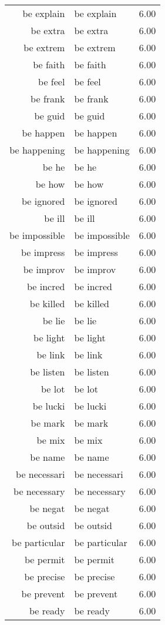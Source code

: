 \begin{table}[ht]
\begin{tabular}{rlr}
  be explain & be explain & 6.00 \\ 
  be extra & be extra & 6.00 \\ 
  be extrem & be extrem & 6.00 \\ 
  be faith & be faith & 6.00 \\ 
  be feel & be feel & 6.00 \\ 
  be frank & be frank & 6.00 \\ 
  be guid & be guid & 6.00 \\ 
  be happen & be happen & 6.00 \\ 
  be happening & be happening & 6.00 \\ 
  be he & be he & 6.00 \\ 
  be how & be how & 6.00 \\ 
  be ignored & be ignored & 6.00 \\ 
  be ill & be ill & 6.00 \\ 
  be impossible & be impossible & 6.00 \\ 
  be impress & be impress & 6.00 \\ 
  be improv & be improv & 6.00 \\ 
  be incred & be incred & 6.00 \\ 
  be killed & be killed & 6.00 \\ 
  be lie & be lie & 6.00 \\ 
  be light & be light & 6.00 \\ 
  be link & be link & 6.00 \\ 
  be listen & be listen & 6.00 \\ 
  be lot & be lot & 6.00 \\ 
  be lucki & be lucki & 6.00 \\ 
  be mark & be mark & 6.00 \\ 
  be mix & be mix & 6.00 \\ 
  be name & be name & 6.00 \\ 
  be necessari & be necessari & 6.00 \\ 
  be necessary & be necessary & 6.00 \\ 
  be negat & be negat & 6.00 \\ 
  be outsid & be outsid & 6.00 \\ 
  be particular & be particular & 6.00 \\ 
  be permit & be permit & 6.00 \\ 
  be precise & be precise & 6.00 \\ 
  be prevent & be prevent & 6.00 \\ 
  be ready & be ready & 6.00 \\ 

\end{tabular}
\end{table}
